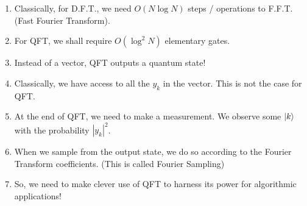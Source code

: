 \documentclass[11.5pt, paper=a4]{article}
\theoremstyle{definition}
\numberwithin{theorem}{section}
\begin{document}
\begin{enumerate}
    \item Classically, for D.F.T., we need $O(N \log{N})$ steps / operations to F.F.T. (Fast Fourier Transform).
    \item For QFT, we shall require $O(\log^2{N})$ elementary gates.
    \item Instead of a vector, QFT outputs a quantum state!
    \item Classically, we have access to all the $y_k$ in the vector. This is not the case for QFT.
    \item At the end of QFT, we need to make a measurement. We observe some $\ket{k}$ with the probability $|y_k|^2$.
    \item When we sample from the output state, we do so according to the Fourier Transform coefficients. (This is called Fourier Sampling)
    \item So, we need to make clever use of QFT to harness its power for algorithmic applications!
\end{enumerate}






\end{document}
